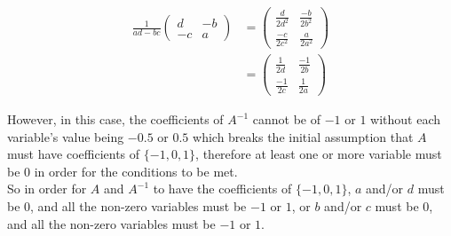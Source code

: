 \documentclass[20pt]{article}
\begin{document}
\begin{text}
    \begin{align}
        \frac{1}{ad-bc}
        \begin{pmatrix}
            d & -b\\
            -c & a
        \end{pmatrix}
        &=
        \begin{pmatrix}
            \frac{d}{2d^2} & \frac{-b}{2b^2}\\
            \frac{-c}{2c^2} & \frac{a}{2a^2}
        \end{pmatrix}
        \nonumber\tag{From the previous implication}\\
        &=
        \begin{pmatrix}
            \frac{1}{2d} & \frac{-1}{2b}\\
            \frac{-1}{2c} & \frac{1}{2a}
        \end{pmatrix}\nonumber
    \end{align}
    
    \noindent
    However, in this case, the coefficients of $A^{-1}$ cannot be of $-1$ or $1$ without each variable's value being $-0.5$ or $0.5$ which breaks the initial assumption that $A$ must have coefficients of $\{-1, 0, 1\}$, therefore at least one or more variable must be $0$ in order for the conditions to be met.\\
    
    \noindent
    So in order for $A$ and $A^{-1}$ to have the coefficients of $\{-1, 0, 1\}$, $a$ and/or $d$ must be 0, and all the non-zero variables must be $-1$ or $1$, or $b$ and/or $c$ must be 0, and all the non-zero variables must be $-1$ or $1$.
\end{text}\\
\end{document}
